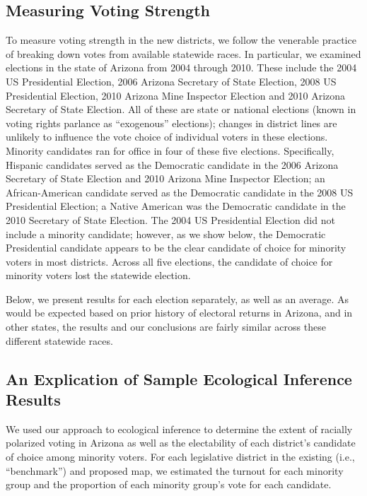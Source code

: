 \documentclass[12pt]{article}
\begin{document}
\subsection{Measuring Voting Strength}

To measure voting strength in the new districts, we follow the
venerable practice of breaking down votes from available statewide
races.  In particular, we examined elections in the state of Arizona
from 2004 through 2010. These include the 2004 US Presidential
Election, 2006 Arizona Secretary of State Election, 2008 US
Presidential Election, 2010 Arizona Mine Inspector Election and 2010
Arizona Secretary of State Election.  All of these are state or
national elections (known in voting rights parlance as ``exogenous''
elections); changes in district lines are unlikely to influence the
vote choice of individual voters in these elections. Minority
candidates ran for office in four of these five elections.
Specifically, Hispanic candidates served as the Democratic candidate
in the 2006 Arizona Secretary of State Election and 2010 Arizona Mine
Inspector Election; an African-American candidate served as the
Democratic candidate in the 2008 US Presidential Election; a Native
American was the Democratic candidate in the 2010 Secretary of State
Election. The 2004 US Presidential Election did not include a minority
candidate; however, as we show below, the Democratic Presidential
candidate appears to be the clear candidate of choice for minority
voters in most districts. Across all five elections, the candidate of choice for minority voters lost the statewide election. 

Below, we present results for each election separately, as well as an
average.  As would be expected based on prior history of electoral
returns in Arizona, and in other states, the results and our
conclusions are fairly similar across these different statewide races.

\subsection{An Explication of Sample Ecological Inference Results}

We used our approach to ecological inference to determine the extent
of racially polarized voting in Arizona as well as the electability of
each district's candidate of choice among minority voters. For each
legislative district in the existing (i.e., ``benchmark'') and
proposed map, we estimated the turnout for each minority group and the
proportion of each minority group's vote for each candidate. 
\end{document}
